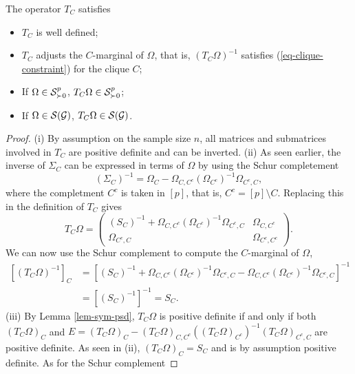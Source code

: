 \begin{proposition}
    The operator $T_C$ satisfies
    \begin{itemize}
        \item[(i)] $T_C$ is well defined;
        \item[(ii)] $T_C$ adjusts the $C$-marginal of $\Omega$, that is, $(T_C \Omega)^{-1}$ satisfies (\ref{eq-clique-constraint}) for the clique $C$;
        \item[(iii)] If $\Omega \in \S^p_{\succ 0}$, $T_C \Omega \in \S^p_{\succ 0}$;
        \item[(iv)] If $\Omega \in \S(\G)$, $T_C \Omega \in \S(\G)$.
    \end{itemize}    
\end{proposition}
\begin{proof}
    (i) By assumption on the sample size $n$, all matrices and submatrices involved in $T_C$ are positive definite and can be inverted.
    \newline
    (ii) As seen earlier, the inverse of $\Sigma_C$ can be expressed in terms of $\Omega$ by using the Schur completement
    \begin{equation*}
        (\Sigma_C)^{-1} = \Omega_C - \Omega_{C, C^c}(\Omega_{C^c})^{-1}\Omega_{C^c, C},
    \end{equation*}
    where the completment $C^c$ is taken in $[p]$, that is, $C^c = [p] \setminus C$. Replacing this in the definition of $T_C$ gives
    \begin{equation} \label{eq-tc-2}
        T_C \Omega = \begin{pmatrix}
            (S_C)^{-1} + \Omega_{C, C^c}(\Omega_{C^c})^{-1}\Omega_{C^c, C} & \Omega_{C, C^c}\\
            \Omega_{C^c, C} & \Omega_{C^c, C^c}
            \end{pmatrix}.
    \end{equation}
    We can now use the Schur complement to compute the $C$-marginal of $\Omega$,
    \begin{align*}
        \left[(T_C \Omega)^{-1}\right]_C 
        &= \left[ (S_C)^{-1} + \Omega_{C, C^c}(\Omega_{C^c})^{-1}\Omega_{C^c, C} - \Omega_{C, C^c}(\Omega_{C^c})^{-1}\Omega_{C^c, C} \right]^{-1}\\
        &= \left[ (S_C)^{-1}\right]^{-1} = S_C.
    \end{align*}
    (iii) By Lemma \ref{lem-sym-psd}, $T_C \Omega$ is positive definite if and only if both $(T_C \Omega)_C$ and $E = (T_C \Omega)_C - (T_C \Omega)_{C, C^c}((T_C \Omega)_{C^c})^{-1}(T_C \Omega)_{C^c,C}$ are positive definite. As seen in (ii), $(T_C \Omega)_C = S_C$ and is by assumption positive definite. As for the Schur complement

\end{proof}
